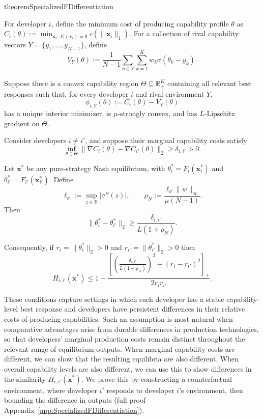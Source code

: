 \begin{restatable}{theorem}{SpecializedFDifferentiation}
\label{thm:SpecializedFDifferentiation}

For developer $i$, define the minimum cost of producing capability
profile $\theta$ as $C_i(\theta):= \min_{\mathbf x_i:\,F_i(\mathbf x_i)=\theta} c(\|\mathbf x_i\|_1)$.
For a collection of rival capability vectors
$Y=\{y_1,\ldots,y_{N-1}\}$, define
\[
V_Y(\theta)
:=
\frac{1}{N-1}
\sum_{y\in Y}
\sum_{k=1}^K
w_k \sigma(\theta_k-y_k).
\]

Suppose there is a convex capability region
$\Theta\subseteq\mathbb R_+^K$ containing all relevant best responses
such that, for every developer $i$ and rival environment $Y$,
\[
\phi_{i,Y}(\theta)
:=
C_i(\theta)-V_Y(\theta)
\]
has a unique interior minimizer, is $\mu$-strongly convex, and has
$L$-Lipschitz gradient on $\Theta$.

Consider developers $i\neq i'$, and suppose their marginal capability
costs satisfy
\[
\inf_{\theta\in\Theta}
\|\nabla C_i(\theta)-\nabla C_{i'}(\theta)\|_2
\ge \delta_{i,i'}>0.
\]

Let $\mathbf x^*$ be any pure-strategy Nash equilibrium, with
$\theta_i^*=F_i(\mathbf x_i^*)$ and
$\theta_{i'}^*=F_{i'}(\mathbf x_{i'}^*)$. Define
\[
\ell_\sigma:=\sup_{z\in\mathbb R}|\sigma''(z)|,
\qquad
\rho_N
:=
\frac{\ell_\sigma\|w\|_\infty}
{\mu(N-1)}.
\]
Then
\[
\|\theta_i^*-\theta_{i'}^*\|_2
\ge
\frac{\delta_{i,i'}}{L(1+\rho_N)}.
\]

Consequently, if 
$r_i=\|\theta_i^*\|_2>  0$ and $r_{i'}=\|\theta_{i'}^*\|_2 > 0$ then
\[
H_{i,i'}(\mathbf x^*)
\le
1-
\frac{
\left[
\left(
\frac{\delta_{i,i'}}{L(1+\rho_N)}
\right)^2
-(r_i-r_{i'})^2
\right]_+
}
{2r_ir_{i'}}.
\]
\end{restatable}

These conditions capture settings in which each developer has a stable capability-level best response and developers have persistent differences in their relative costs of producing capabilities. 
Such an assumption is most natural when comparative advantages arise from durable differences in production technologies, so that developers' marginal production costs remain distinct throughout the relevant range of equilibrium outputs.
When marginal capability costs are different, we can show that the resulting equilibria are also different. 
When overall capability levels are also different, we can use this to show differences in the similarity $H_{i,i'}(\mathbf{x}^*)$.
We prove this by constructing a counterfactual environment, where developer $i'$ responds to developer $i$'s environment, then bounding the difference in outputs (full proof Appendix~\ref{app:SpecializedFDifferentiation}). 

